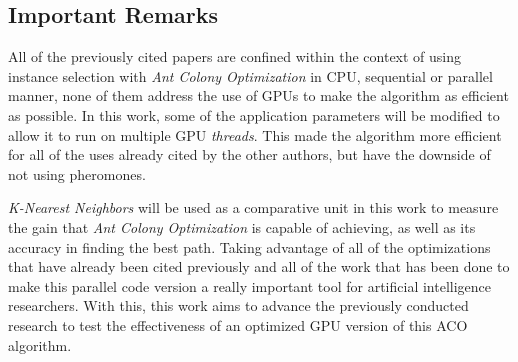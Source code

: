 \subsection{Important Remarks}

All of the previously cited papers are confined within the context of using instance selection with \emph{Ant Colony Optimization} in CPU, sequential or parallel manner, none of them address the use of GPUs to
make the algorithm as efficient as possible. In this work, some of the application parameters will be modified to allow it to run on multiple GPU \emph{threads}. This made the algorithm more efficient for all of the uses already cited by the other authors, but have the downside
of not using pheromones.

\emph{K-Nearest Neighbors} will be used as a comparative unit in this work to measure the gain that \emph{Ant Colony Optimization} is capable of achieving, as well as its accuracy in finding the best path. Taking advantage of all of the optimizations that have already been cited previously and all of the work that has been done to make this parallel code version a really important tool for artificial intelligence researchers. With this, this work aims to advance the previously conducted research to test the effectiveness of an optimized GPU version of this ACO algorithm.
